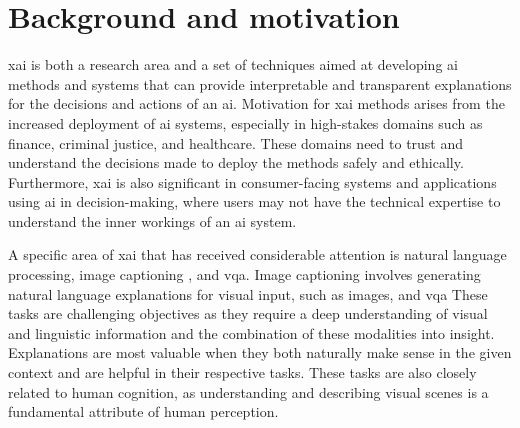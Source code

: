 \label{sec:1_1_background_and_motivation}

\begin{comment}
In about a page, summarize the most important background information. The text usually leads to YOUR PROBLEM STATEMENT (in the next section) and gives arguments about why this is a challenge today.
\end{comment}

\section{Background and motivation}

\gls{xai} is both a research area and a set of techniques aimed at developing \gls{ai} methods and systems that can provide interpretable and transparent explanations for the decisions and actions of an \gls{ai}. Motivation for \gls{xai} methods arises from the increased deployment of \gls{ai} systems, especially in high-stakes domains such as finance, criminal justice, and healthcare. These domains need to trust and understand the decisions made to deploy the methods safely and ethically. Furthermore, \gls{xai} is also significant in consumer-facing systems and applications using \gls{ai} in decision-making, where users may not have the technical expertise to understand the inner workings of an \gls{ai} system.

A specific area of \gls{xai} that has received considerable attention is natural language processing, image captioning \cite{vinyalsShowTellNeural2015, youImageCaptioningSemantic2016, vinyalsShowTellLessons2017}, and \gls{vqa}. Image captioning involves generating natural language explanations for visual input, such as images, and \gls{vqa} 
These tasks are challenging objectives as they require a deep understanding of visual and linguistic information and the combination of these modalities into insight. Explanations are most valuable when they both naturally make sense in the given context and are helpful in their respective tasks. These tasks are also closely related to human cognition, as understanding and describing visual scenes is a fundamental attribute of human perception. 

